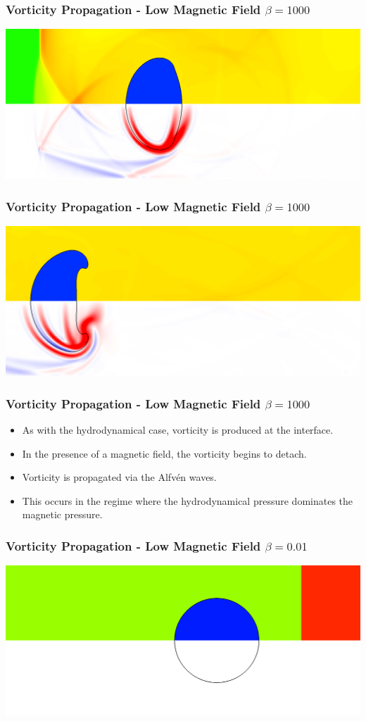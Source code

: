 \documentclass{beamer}
\begin{document}
\begin{frame}
\frametitle{Vorticity Propagation - Low Magnetic Field $\beta = 1000$}
\includegraphics[width=\textwidth]{../images/SRMHDBubbleBeta1000_t59_crop.png}
\end{frame}

\begin{frame}
\frametitle{Vorticity Propagation - Low Magnetic Field $\beta = 1000$}
\includegraphics[width=\textwidth]{../images/SRMHDBubbleBeta1000_t125_crop.png}
\end{frame}

\begin{frame}
\frametitle{Vorticity Propagation - Low Magnetic Field $\beta = 1000$}
\begin{itemize}
\item{As with the hydrodynamical case, vorticity is produced at the interface.}
\item{In the presence of a magnetic field, the vorticity begins to detach.}
\item{Vorticity is propagated via the Alfv\'{e}n waves.}
\item{This occurs in the regime where the hydrodynamical pressure dominates the magnetic pressure.}
\end{itemize}
\end{frame}
\begin{frame}
\frametitle{Vorticity Propagation - Low Magnetic Field $\beta = 0.01$}
\includegraphics[width=\textwidth]{../images/SRMHDBubbleBeta001_t0_crop.png}
\end{frame}
\end{document}
